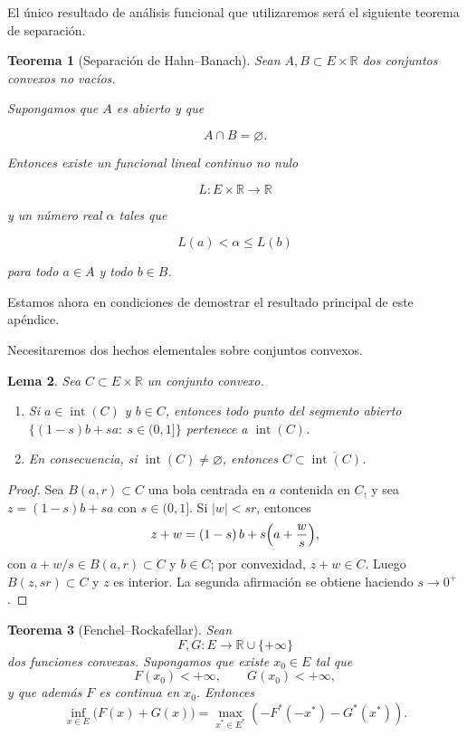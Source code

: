 \documentclass[12pt, a4paper]{amsbook}
\newcommand{\R}{{\mathbb R}}
\newtheorem{teo}{Teorema}[section]
\newtheorem{lema}[teo]{Lema}
\theoremstyle{remark}
\theoremstyle{definition}
\numberwithin{section}{chapter}
\numberwithin{subsection}{section}
\numberwithin{equation}{section}
\numberwithin{figure}{chapter}
\begin{document}
El único resultado de análisis funcional que utilizaremos será el siguiente
teorema de separación.

\begin{teo}[Separación de Hahn--Banach]
Sean $A,B\subset E\times\mathbb R$ dos conjuntos convexos no vacíos.

Supongamos que $A$ es abierto y que

\[
A\cap B=\varnothing.
\]

Entonces existe un funcional lineal continuo no nulo

\[
L:E\times\mathbb R\longrightarrow\mathbb R
\]

y un número real $\alpha$ tales que

\[
L(a)<\alpha\le L(b)
\]

para todo $a\in A$ y todo $b\in B$.
\end{teo}

Estamos ahora en condiciones de demostrar el resultado principal de este
apéndice.

Necesitaremos dos hechos elementales sobre conjuntos convexos.

\begin{lema}\label{lema.convexos}
Sea $C\subset E\times\R$ un conjunto convexo.
\begin{enumerate}
\item Si $a\in\operatorname{int}(C)$ y $b\in C$, entonces todo punto del
segmento abierto $\{(1-s)b+sa:\ s\in(0,1]\}$ pertenece a $\operatorname{int}(C)$.
\item En consecuencia, si $\operatorname{int}(C)\neq\varnothing$, entonces
$C\subset\overline{\operatorname{int}(C)}$.
\end{enumerate}
\end{lema}

\begin{proof}
Sea $B(a,r)\subset C$ una bola centrada en $a$ contenida en $C$, y sea
$z=(1-s)b+sa$ con $s\in(0,1]$. Si $|w|<sr$, entonces
\[
z+w=(1-s)\,b+s\Bigl(a+\frac{w}{s}\Bigr),
\]
con $a+w/s\in B(a,r)\subset C$ y $b\in C$; por convexidad, $z+w\in C$. Luego
$B(z,sr)\subset C$ y $z$ es interior. La segunda afirmación se obtiene haciendo
$s\to0^+$.
\end{proof}

\begin{teo}[Fenchel--Rockafellar]\label{teo.FR}
Sean
\[
F,G:E\longrightarrow\mathbb R\cup\{+\infty\}
\]
dos funciones convexas. Supongamos que existe $x_0\in E$ tal que
\[
F(x_0)<+\infty,
\qquad
G(x_0)<+\infty,
\]
y que además $F$ es continua en $x_0$. Entonces
\[
\inf_{x\in E}
\bigl(F(x)+G(x)\bigr)
=
\max_{x^*\in E^*}
\left(
-F^*(-x^*)
-
G^*(x^*)
\right).
\]
\end{teo}
\end{document}
